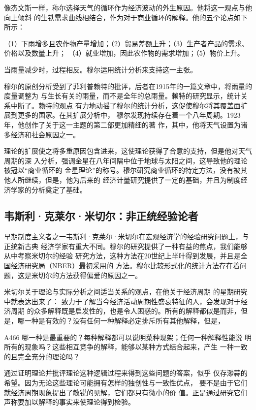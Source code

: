 像杰文斯一样，称尔选择天气的循环作为经济波动的外生原因。他将这一观点与他向上倾斜
的生铁需求曲线相结合，作为对于商业循环的解释。他的五个论点如下所示：

（1）下雨增多且农作物产量增加；（2）贸易差额上升；（3）生产者产品的需求、价格以及数量上升；
（4）就业增加，因此农作物的需求增加；（5）物价上升。

当雨量减少时，过程相反。穆尔运用统计分析来支持这一主张。

穆尔的原创分析受到了菲利普赖特的批评，后者在1915年的一篇文章中，将雨量的度量调整为
与生长有关的雨量，而不是全年的总雨量。赖特的研究显示，统计关系中断了。赖特的观点
有力地动摇了穆尔的统计分析，这促使穆尔将其覆盖面扩展到更多的国家。在其扩展分析中，
穆尔发现持续存在着一个八年周期。1923年，他创作了关于这一主题的第二部更加精细的著
作，其中，他将天气设置为诸多经济和社会原因之一。

理论的扩展使之将多重原因包含进来，这使理论获得了合意的支持，但是他对天气周期的深
入分析，强调金星在八年间隔中位于地球与太阳之间，这导致他的理论被冠以“商业循环的
金星理论”的称号。穆尔研究商业循环的特定方法，没有被其他人所继续，但是，他为后来的
经济计量研究提供了一定的基础，并且为制度经济学家的分析奠定了基础。

\subsection{韦斯利·克莱尔·米切尔：非正统经验论者}

早期制度主义者之一韦斯利·克莱尔·米切尔在宏观经济学的经验研究问题上，与正统新古典
经济学家有重大不同。穆尔的研究提供了一种有益的焦点，我们能够从中考察米切尔的经验
研究方法，这种方法在20世纪上半叶得到发展，并且是全国经济研究局（NBER）最初采用的
方法。穆尔比较形式化的统计方法存在着问题，这是米切尔的方法获得偏爱的原因之一。

米切尔关于理论与实际分析之间适当关系的观点，在他关于经济周期
的星期研究中就表达出来了：
致力于了解当今经济活动周期性盛衰特征的人，会发现对于经济周期
的众多解释既是启发性的，也是令人困惑的。所有的解释都似是而非，但
是，哪一种是有效的？没有任何一种解释必定排斥所有其他解释，但是，


A466
哪一种是最重要的？每种解释都可以说明菜种现架；任何一种解释性能说
明所有的现象吗？这些相互竞争的解释，能够以某种方式结合起来，产生
一种一致的且完全充分的理论吗？

通过证明理论并批评理论这种逻辑过程来得到这些问题的答案，似乎
仅存渺蒜的希望。因为无论这些理论可能拥有怎样的独创性与一致性优点，
要不是由于它们就经济周期现象提出了敏锐的见解，它们都只有微小的价
值。正是通过研究它们声称要加以解释的事实来使理论得到检验。

